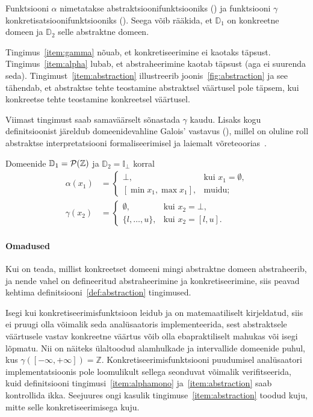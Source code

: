 \documentclass[../thesis.tex]{subfiles}
\begin{document}
Funktsiooni $\alpha$ nimetatakse abstraktsioonifunktsiooniks () ja funktsiooni $\gamma$ konkretisatsioonifunktsiooniks ().
Seega võib rääkida, et $\mathbb{D}_1$ on konkreetne domeen ja $\mathbb{D}_2$ selle abstraktne domeen.

Tingimus~\ref{item:gamma} nõuab, et konkretiseerimine ei kaotaks täpsust.
Tingimus~\ref{item:alpha} lubab, et abstraheerimine kaotab täpsust (aga ei suurenda seda).
Tingimust~\ref{item:abstraction} illustreerib joonis~\ref{fig:abstraction} ja see tähendab, et abstraktse tehte teostamine abstraktsel väärtusel pole täpsem, kui konkreetse tehte teostamine konkreetsel väärtusel.

Viimast tingimust saab samaväärselt sõnastada $\gamma$ kaudu. Lisaks kogu definitsioonist järeldub domeenidevahline Galois' vastavus (), millel on oluline roll abstraktse interpretatsiooni formaliseerimisel ja laiemalt võreteoorias~\cite{cousot77}.

Domeenide $\mathbb{D}_1 = \mathcal{P}(\mathbb{Z})$ ja $\mathbb{D}_2 = \mathbb{I}_\bot$ korral~\cite[243]{cousot77}
\begin{align*}
	\alpha(x_1) &= \begin{cases}
		\bot, & \text{kui } x_1 = \emptyset, \\
		[\min x_1, \max x_1], & \text{muidu};
	\end{cases} \\
	\gamma(x_2) &= \begin{cases}
		\emptyset, & \text{kui } x_2 = \bot, \\
		\{l, \ldots, u\}, & \text{kui } x_2 = [l, u].
	\end{cases}
\end{align*}

\paragraph{Omadused}
Kui on teada, millist konkreetset domeeni mingi abstraktne domeen abstraheerib, ja nende vahel on defineeritud abstraheerimine ja konkretiseerimine, siis peavad kehtima definitsiooni~\ref{def:abstraction} tingimused.

Isegi kui konkretiseerimisfunktsioon leidub ja on matemaatiliselt kirjeldatud, siis ei pruugi olla võimalik seda analüsaatoris implementeerida, sest abstraktsele väärtusele vastav konkreetne väärtus võib olla ebapraktiliselt mahukas või isegi lõpmatu. Nii on näiteks ülaltoodud alamhulkade ja intervallide domeenide puhul, kus $\gamma([-\infty, +\infty]) = \mathbb{Z}$. Konkretiseerimisfunktsiooni puudumisel analüsaatori implementatsioonis pole loomulikult sellega seonduvat võimalik verifitseerida, kuid definitsiooni tingimusi~\ref{item:alphamono} ja~\ref{item:abstraction} saab kontrollida ikka. Seejuures ongi kasulik tingimuse~\ref{item:abstraction} toodud kuju, mitte selle konkretiseerimisega kuju.
\end{document}

